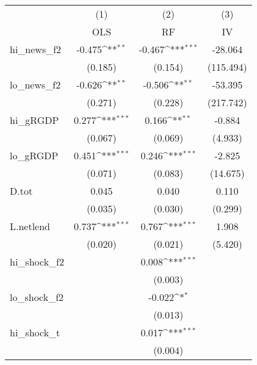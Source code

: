 {
\def\sym#1{\ifmmode^{#1}\else\(^{#1}\)\fi}
\begin{tabular}{l*{3}{c}}
\toprule
            &\multicolumn{1}{c}{(1)}&\multicolumn{1}{c}{(2)}&\multicolumn{1}{c}{(3)}\\
            &\multicolumn{1}{c}{OLS}&\multicolumn{1}{c}{RF}&\multicolumn{1}{c}{IV}\\
\midrule
hi\_news\_f2  &      -0.475\sym{**} &      -0.467\sym{***}&     -28.064         \\
            &     (0.185)         &     (0.154)         &   (115.494)         \\
\addlinespace
lo\_news\_f2  &      -0.626\sym{**} &      -0.506\sym{**} &     -53.395         \\
            &     (0.271)         &     (0.228)         &   (217.742)         \\
\addlinespace
hi\_gRGDP    &       0.277\sym{***}&       0.166\sym{**} &      -0.884         \\
            &     (0.067)         &     (0.069)         &     (4.933)         \\
\addlinespace
lo\_gRGDP    &       0.451\sym{***}&       0.246\sym{***}&      -2.825         \\
            &     (0.071)         &     (0.083)         &    (14.675)         \\
\addlinespace
D.tot       &       0.045         &       0.040         &       0.110         \\
            &     (0.035)         &     (0.030)         &     (0.299)         \\
\addlinespace
L.netlend   &       0.737\sym{***}&       0.767\sym{***}&       1.908         \\
            &     (0.020)         &     (0.021)         &     (5.420)         \\
\addlinespace
hi\_shock\_f2 &                     &       0.008\sym{***}&                     \\
            &                     &     (0.003)         &                     \\
\addlinespace
lo\_shock\_f2 &                     &      -0.022\sym{*}  &                     \\
            &                     &     (0.013)         &                     \\
\addlinespace
hi\_shock\_t  &                     &       0.017\sym{***}&                     \\
            &                     &     (0.004)         &                     \\

\end{tabular}}
